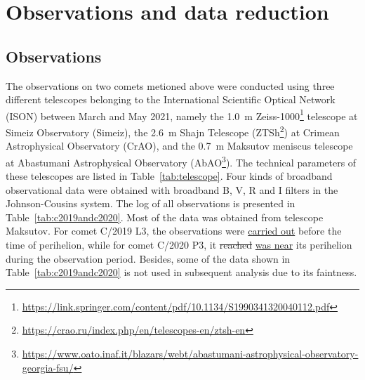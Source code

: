 \section{Observations and data reduction} \label{sec:obs_data}

\subsection{Observations}

The observations on two comets metioned above were conducted using three different telescopes belonging to the International Scientific Optical Network (ISON) between March and May 2021, namely the {\SI{1.0}{\m}} Zeiss-1000\footnote{\href{https://link.springer.com/content/pdf/10.1134/S1990341320040112.pdf}{https://link.springer.com/content/pdf/10.1134/S1990341320040112.pdf}} 
telescope at Simeiz Observatory (Simeiz), the {\SI{2.6}{\m}} Shajn Telescope (ZTSh\footnote{\href{https://crao.ru/index.php/en/telescopes-en/ztsh-en}{https://crao.ru/index.php/en/telescopes-en/ztsh-en}}) 
at Crimean Astrophysical Observatory (CrAO), and the {\SI{0.7}{\m}} Maksutov meniscus telescope at Abastumani Astrophysical Observatory (AbAO\footnote{\href{https://www.oato.inaf.it/blazars/webt/abastumani-astrophysical-observatory-georgia-fsu/}{https://www.oato.inaf.it/blazars/webt/abastumani-astrophysical-observatory-georgia-fsu/}}). 
The technical parameters of these telescopes are listed in Table~\ref{tab:telescope}. Four kinds of broadband observational data were obtained with broadband B, V, R and I filters in the Johnson-Cousins system. The log of all observations is presented in Table~\ref{tab:c2019andc2020}. Most of the data was obtained from telescope Maksutov. For comet C/2019 L3, the observations were \ul{carried out} before the time of perihelion, while for comet C/2020 P3, it \st{reached} \ul{was near} its perihelion during the observation period. Besides, some of the data shown in Table~\ref{tab:c2019andc2020} is not used in subsequent analysis due to its faintness. 

